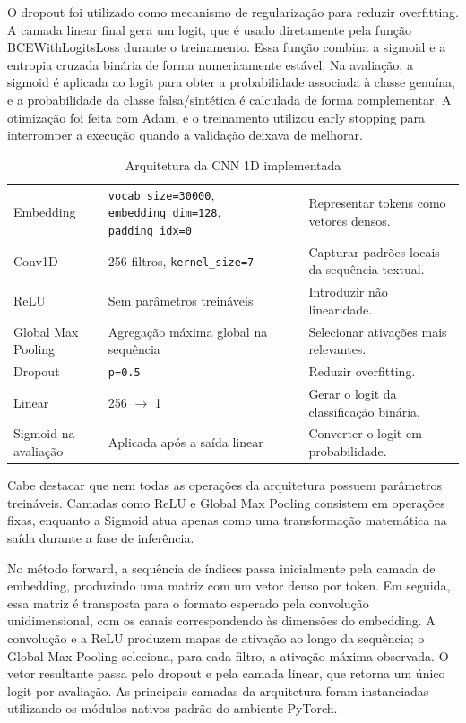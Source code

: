 \documentclass[12pt,a4paper]{article}
\begin{document}
O dropout foi utilizado como mecanismo de regularização para reduzir overfitting. A camada linear final gera um logit, que é usado diretamente pela função BCEWithLogitsLoss durante o treinamento. Essa função combina a sigmoid e a entropia cruzada binária de forma numericamente estável. Na avaliação, a sigmoid é aplicada ao logit para obter a probabilidade associada à classe genuína, e a probabilidade da classe falsa/sintética é calculada de forma complementar. A otimização foi feita com Adam, e o treinamento utilizou early stopping para interromper a execução quando a validação deixava de melhorar.

\begin{table}[H]
\centering
\renewcommand{\arraystretch}{1.25}
\caption{Arquitetura da CNN 1D implementada}
\label{tab:arquitetura-cnn}
\begin{tabularx}{\textwidth}{@{} L{3.7cm} L{5.0cm} Y @{}}
\toprule
{} &
 &
 \\
\midrule
Embedding & \texttt{vocab\_size=30000}, \texttt{embedding\_dim=128}, \texttt{padding\_idx=0} & Representar tokens como vetores densos. \\
\addlinespace
Conv1D & 256 filtros, \texttt{kernel\_size=7} & Capturar padrões locais da sequência textual. \\
\addlinespace
ReLU & Sem parâmetros treináveis & Introduzir não linearidade. \\
\addlinespace
Global Max Pooling & Agregação máxima global na sequência & Selecionar ativações mais relevantes. \\
\addlinespace
Dropout & \texttt{p=0.5} & Reduzir overfitting. \\
\addlinespace
Linear & 256 \(\rightarrow\) 1 & Gerar o logit da classificação binária. \\
\addlinespace
Sigmoid na avaliação & Aplicada após a saída linear & Converter o logit em probabilidade. \\
\bottomrule
\end{tabularx}
\end{table}

Cabe destacar que nem todas as operações da arquitetura possuem parâmetros treináveis. Camadas como ReLU e Global Max Pooling consistem em operações fixas, enquanto a Sigmoid atua apenas como uma transformação matemática na saída durante a fase de inferência.


No método forward, a sequência de índices passa inicialmente pela camada de embedding, produzindo uma matriz com um vetor denso por token. Em seguida, essa matriz é transposta para o formato esperado pela convolução unidimensional, com os canais correspondendo às dimensões do embedding. A convolução e a ReLU produzem mapas de ativação ao longo da sequência; o Global Max Pooling seleciona, para cada filtro, a ativação máxima observada. O vetor resultante passa pelo dropout e pela camada linear, que retorna um único logit por avaliação. As principais camadas da arquitetura foram instanciadas utilizando os módulos nativos padrão do ambiente PyTorch.
\end{document}
